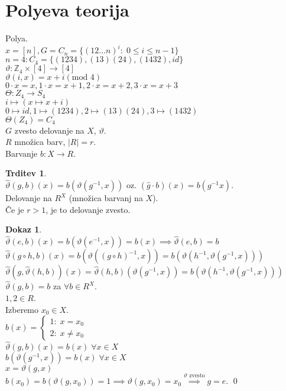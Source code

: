 \documentclass[a4paper, 12pt]{book}
\theoremstyle{definition}
\newtheorem{claim}[counter]{Trditev}
\newtheorem{pro}[counter]{Dokaz}
\theoremstyle{remark}
\newcommand{\Z}{\mathbb{Z}}
\begin{document}
\section{Polyeva teorija}

Polya. \\
$x = [n], G = C_n = \{(1 2 \dots n)^i: \; 0 \leq i \leq n-1\}$ \\
$n = 4: C_4 = \{(1 2 3 4), (1 3) (2 4), (1 4 3 2), id\}$ \\
$\vartheta: \Z_4 \times [4] \to [4]$ \\
$\vartheta(i, x) = x + i (\text{mod } 4)$ \\
$0 \cdot x = x, 1 \cdot x = x+1, 2 \cdot x = x+2, 3 \cdot x = x+3$ \\
$\Theta: Z_4 \to S_4$ \\
$i \mapsto (x \mapsto x+i)$ \\
$0 \mapsto id, 1 \mapsto (1 2 3 4), 2 \mapsto (1 3) (2 4), 3 \mapsto (1 4 3 2)$ \\
$\Theta(Z_4) = C_4$ \\
$G$ zvesto delovanje na $X$, $\vartheta$. \\
$R$ množica barv, $|R| = r$. \\
Barvanje $b: X \to R$.
\begin{claim} \text{} \\
  $\widehat{\vartheta}(g,b)(x) = b(\vartheta(g^{-1}, x))$ oz. $(\hat{g} \cdot b)(x) = b(g^{-1} x)$. \\
  Delovanje na $R^X$ (množica barvanj na $X$). \\
  Če je $r > 1$, je to delovanje zvesto. \\
\end{claim}
\begin{pro} \text{} \\
  $\widehat{\vartheta}(e,b)(x) = b(\vartheta(e^{-1},x)) = b(x) \implies \widehat{\vartheta}(e,b) = b$ \\
  $\widehat{\vartheta}(g \circ h, b)(x) = b(\vartheta((g \circ h)^{-1}, x)) = b(\vartheta(h^{-1}, \vartheta(g^{-1}, x)))$ \\
  $\widehat{\vartheta}(g, \widehat{\vartheta}(h, b))(x) = \widehat{\vartheta}(h, b)(\vartheta(g^{-1}, x)) =
  b(\vartheta(h^{-1}, \vartheta(g^{-1}, x)))$ \\
  $\widehat{\vartheta}(g, b) = b$ za $\forall b \in R^X$. \\
  $1, 2 \in R$. \\
  Izberemo $x_0 \in X$. \\
  $b(x) = \begin{cases}
    1: \; x = x_0 \\
    2: \; x \neq x_0
  \end{cases}$ \\
  $\widehat{\vartheta}(g, b)(x) = b(x) \; \forall x \in X$ \\
  $b(\vartheta(g^{-1}, x)) = b(x) \; \forall x \in X$ \\
  $x = \vartheta(g, x)$ \\
  $b(x_0) = b(\vartheta(g, x_0)) = 1 \implies \vartheta(g, x_0) = x_0 \stackrel{\vartheta \text{ zvesto}}{\implies} g = e$.
  \qed
\end{pro}
\end{document}
